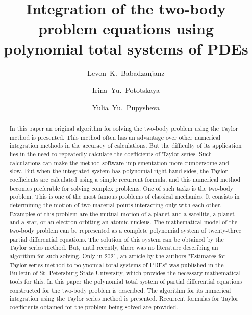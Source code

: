 \begin{englishtitle} %
\title{Integration of the two-body problem equations using  polynomial total systems of PDEs}
\author{Levon~K.~Babadzanjanz   \and  Irina~Yu.~Pototskaya   \and  Yulia~Yu.~Pupysheva
}

\maketitle

\begin{abstract}
In this paper an original algorithm for solving the two-body problem using the Taylor method is presented. This method often has an advantage over other numerical integration methods in the accuracy of calculations. But the difficulty of its application lies in the need to repeatedly calculate the coefficients of Taylor series. Such calculations can make the method software implementation more cumbersome and slow. But when the integrated system has polynomial right-hand sides, the Taylor coefficients are calculated using a simple recurrent formula, and this numerical method becomes preferable for solving complex problems.
One of such tasks is the two-body problem. This is one of the most famous problems of classical mechanics. It consists in determining the motion of two material points interacting only with each other. Examples of this problem are the mutual motion of a planet and a satellite, a planet and a star, or an electron orbiting an atomic nucleus. The mathematical model of the two-body problem can be represented as a complete polynomial system of twenty-three partial differential equations. The solution of this system can be obtained by the Taylor series method. But, until recently, there was no literature describing an algorithm for such solving. Only in 2021, an article by the authors "Estimates for Taylor series method to polynomial total systems of PDEs" was published in the Bulletin of St. Petersburg State University, which provides the necessary mathematical tools for this.
In this paper the polynomial total system of partial differential equations constructed for the two-body problem is described. The algorithm for its numerical integration using the Taylor series method is presented. Recurrent formulas for Taylor coefficients obtained for the problem being solved are provided.


\end{abstract}
\end{englishtitle}

